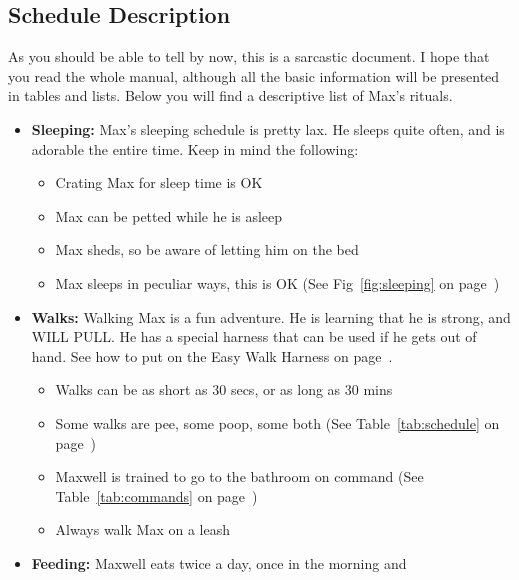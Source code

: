 \documentclass[pdftex,12pt]{article}
\begin{document}
\pagebreak

\subsection{Schedule Description}

As you should be able to tell by now, this is a sarcastic document. I hope that
you read the whole manual, although all the basic information will be presented in
tables and lists. Below you will find a descriptive list of Max's rituals.

\bigskip

\begin{itemize}\label{itm:schedule}
    \item \textbf{Sleeping:} Max's sleeping schedule is pretty lax. He sleeps 
        quite often, and is adorable the entire time. Keep in mind the following:
        \begin{itemize}
            \item Crating Max for sleep time is OK
            \item Max can be petted while he is asleep
            \item Max sheds, so be aware of letting him on the bed
            \item Max sleeps in peculiar ways, this is OK
                (See Fig~\ref{fig:sleeping} on page~\pageref{fig:sleeping})
        \end{itemize}
    \item \textbf{Walks:} Walking Max is a fun adventure. He is learning that he
        is strong, and WILL PULL. He has a special harness that can be used if he 
        gets out of hand. See how to put on the Easy Walk Harness on
        page~\pageref{itm:how_to_harness}.
        \begin{itemize}
            \item Walks can be as short as 30 secs, or as long as 30 mins
            \item Some walks are pee, some poop, some both
                (See Table~\ref{tab:schedule} on page~\pageref{tab:schedule})
            \item Maxwell is trained to go to the bathroom on command
                (See Table~\ref{tab:commands} on page~\pageref{tab:commands})
            \item Always walk Max on a leash
        \end{itemize}
    \item \textbf{Feeding:} Maxwell eats twice a day, once in the morning and

\end{itemize}
\end{document}
